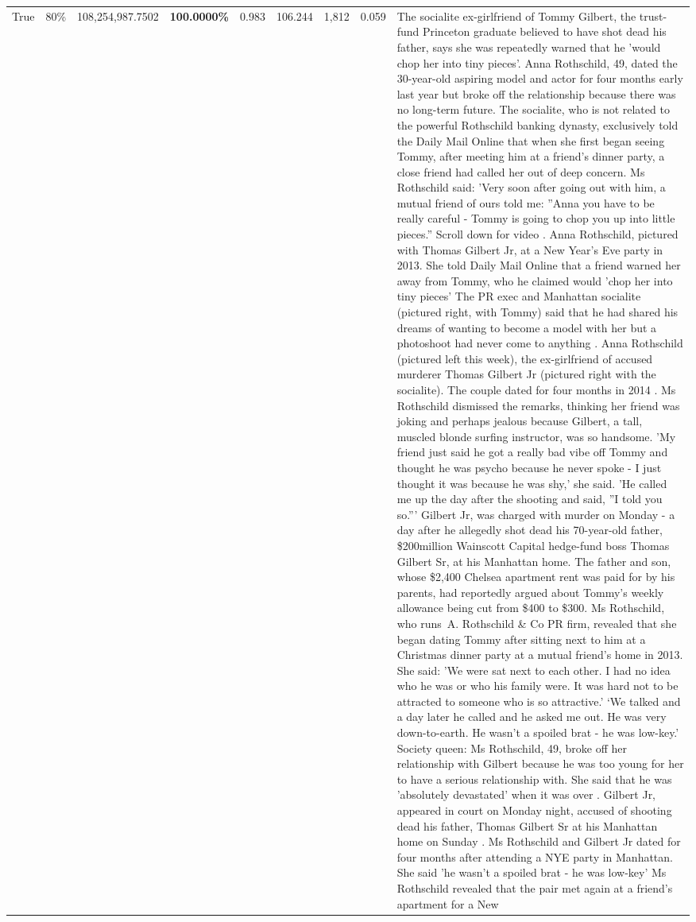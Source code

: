 \begin{table}[H]
\begin{tabular}{lllrlllll}
True & 80\% & 108,254,987.7502 & \bfseries \color{red} 100.0000\% & 0.983 & 106.244 & 1,812 & 0.059 & The socialite ex-girlfriend of Tommy Gilbert, the trust-fund Princeton graduate believed to have shot dead his father, says she was repeatedly warned that he 'would chop her into tiny pieces'. Anna Rothschild, 49, dated the 30-year-old aspiring model and actor for four months early last year but broke off the relationship because there was no long-term future. The socialite, who is not related to the powerful Rothschild banking dynasty, exclusively told the Daily Mail Online that when she first began seeing Tommy, after meeting him at a friend's dinner party, a close friend had called her out of deep concern. Ms Rothschild said: 'Very soon after going out with him, a mutual friend of ours told me: ''Anna you have to be really careful - Tommy is going to chop you up into little pieces.'' Scroll down for video . Anna Rothschild, pictured with Thomas Gilbert Jr, at a New Year's Eve party in 2013. She told Daily Mail Online that a friend warned her away from Tommy, who he claimed would 'chop her into tiny pieces' The PR exec and Manhattan socialite (pictured right, with Tommy) said that he had shared his dreams of wanting to become a model with her but a photoshoot had never come to anything . Anna Rothschild (pictured left this week), the ex-girlfriend of accused murderer Thomas Gilbert Jr (pictured right with the socialite). The couple dated for four months in 2014 . Ms Rothschild dismissed the remarks, thinking her friend was joking and perhaps jealous because Gilbert, a tall, muscled blonde surfing instructor, was so handsome. 'My friend just said he got a really bad vibe off Tommy and thought he was psycho because he never spoke - I just thought it was because he was shy,' she said. 'He called me up the day after the shooting and said, ''I told you so.''' Gilbert Jr, was charged with murder on Monday - a day after he allegedly shot dead his 70-year-old father, \$200million Wainscott Capital hedge-fund boss Thomas Gilbert Sr, at his Manhattan home. The father and son, whose \$2,400 Chelsea apartment rent was paid for by his parents, had reportedly argued about Tommy's weekly allowance being cut from \$400 to \$300. Ms Rothschild, who runs A. Rothschild \& Co PR firm, revealed that she began dating Tommy after sitting next to him at a Christmas dinner party at a mutual friend's home in 2013. She said: 'We were sat next to each other. I had no idea who he was or who his family were. It was hard not to be attracted to someone who is so attractive.' ‘We talked and a day later he called and he asked me out. He was very down-to-earth. He wasn’t a spoiled brat - he was low-key.’ Society queen: Ms Rothschild, 49, broke off her relationship with Gilbert because he was too young for her to have a serious relationship with. She said that he was 'absolutely devastated' when it was over . Gilbert Jr, appeared in court on Monday night, accused of shooting dead his father, Thomas Gilbert Sr at his Manhattan home on Sunday . Ms Rothschild and Gilbert Jr dated for four months after attending a NYE party in Manhattan. She said 'he wasn't a spoiled brat - he was low-key' Ms Rothschild revealed that the pair met again at a friend’s apartment for a New 
\end{tabular}
\end{table}
